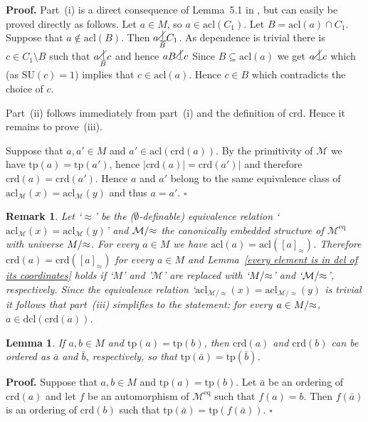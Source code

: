\documentclass[11pt, twoside]{amsart}
\newtheorem{lem}[theor]{Lemma}
\newtheorem{rem}[theor]{Remark}
\numberwithin{equation}{section}
\newcommand{\tp}{\mathrm{tp}}
\newcommand{\acl}{\mathrm{acl}}
\newcommand{\dcl}{\mathrm{dcl}}
\newcommand{\es}{\emptyset}
\newcommand{\su}{\mathrm{SU}}
\newcommand{\nts}{\negthickspace}
\newcommand{\approxc}{\nts \approx}
\newcommand{\crd}{\mathrm{crd}}
\newcommand{\meq}{^{\mathrm{eq}}}
\newcommand{\mcM}{\mathcal{M}}
\newcommand{\nind}{\raisebox{-2pt}[5pt][0pt]{$\smile$} 
\hspace*{-6.8pt}\raisebox{3pt}[5pt][0pt]{$|$}\hspace*{-6.8pt}
\raisebox{3pt}[5pt][0pt]{$\diagup$} }
\begin{document}
\noindent
{\bf Proof.}
Part~(i) is a direct consequence of  Lemma~5.1 in \cite{Djo06}, but can easily be proved directly as follows.
Let $a \in M$, so $a \in \acl(C_1)$.
Let $B = \acl(a) \cap C_1$.
Suppose that $a \notin \acl(B)$. 
Then $a \underset{B}{\nind} C_1$.
As dependence is trivial there is $c \in C_1 \setminus B$ such that 
$a \underset{B}{\nind} c$ and hence $aB \nind c$
Since $B \subseteq \acl(a)$ we get $a \nind c$ which (as $\su(c) = 1$) implies that
$c \in \acl(a)$. Hence $c \in B$ which contradicts the choice of $c$.

Part~(ii) follows immediately from part~(i) and the definition of $\crd$.
Hence it remains to prove~(iii).

Suppose that $a, a' \in M$ and $a' \in \acl(\crd(a))$.
By the primitivity of $\mcM$ we have $\tp(a) = \tp(a')$, hence $|\crd(a)| = \crd(a')|$ and therefore 
$\crd(a) = \crd(a')$. Hence $a$ and $a'$ belong to the same equivalence class
of $\acl_\mcM(x) = \acl_\mcM(y)$ and thus $a = a'$.
\hfill $\square$


\begin{rem}\label{remark on lemma about properties of crd}{\rm
Let `$\approx$' be the ($\es$-definable) equivalence relation `$\acl_\mcM(x) = \acl_\mcM(y)$' and 
$\mcM / \approxc$ the canonically embedded structure of $\mcM\meq$ with universe $M / \approxc$.
For every $a \in M$ we have $\acl(a) = \acl([a]_\approx)$.
Therefore $\crd(a) = \crd([a]_\approx)$ for every $a \in M$ and Lemma~\ref{every element is in dcl of its coordinates}
holds if `$M$'  and '$\mcM$' are replaced with `$M / \approxc$' and `$\mcM / \approxc$', respectively.
Since the equivalence relation `$\acl_{\mcM / \approx}(x) = \acl_{\mcM / \approx}(y)$ is trivial
it follows that part~(iii) simplifies to the statement: 
for every $a \in M / \approxc$, $a \in \dcl(\crd(a))$.
}\end{rem}


\begin{lem}\label{crd is unique up to isomorphism}
If $a, b \in M$ and $\tp(a) = \tp(b)$, then $\crd(a)$ and $\crd(b)$ can be ordered as $\bar{a}$ and $\bar{b}$, respectively,
so that $\tp(\bar{a}) = \tp(\bar{b})$.
\end{lem}

\noindent
{\bf Proof.}
Suppose that $a, b \in M$ and $\tp(a) = \tp(b)$.
Let $\bar{a}$ be an ordering of $\crd(a)$ and let $f$ be an automorphism of $\mcM\meq$
such that $f(a) = b$. Then $f(\bar{a})$ is an ordering of $\crd(b)$ such that
$\tp(\bar{a}) = \tp(f(\bar{a}))$.
\hfill $\square$
\\
\end{document}
